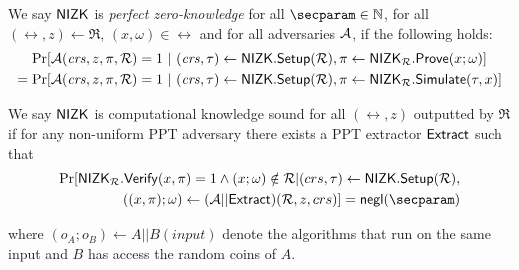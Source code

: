 \def\advV{\ensuremath{V^*}\xspace} %

\begin{definition}\label{def:nizk_zero_knowledge}
We say ${\mathsf{NIZK}}$ is {\em perfect zero-knowledge} for all $ \secparam \in \mathbb{N} $, for all $ (\rel,z) \leftarrow \mathfrak{R} $, $ (x,\omega) \in \rel $ and for all adversaries $ \mathcal{A} $, if the following holds:
\begin{align*}
	\Pr[& \mathcal{A}(\mathit{crs}, z, \pi,\mathcal{R}) = 1 \ | \ (\mathit{crs}, \tau) \leftarrow {\ensuremath{\mathsf{NIZK}}}.{\mathsf{Setup}} (\mathcal{R}),   \pi \leftarrow {\ensuremath{\mathsf{NIZK}}}_{\mathcal{R}}.{\mathsf{Prove}} (x;\omega)]\\
	=\Pr[& \mathcal{A}(\mathit{crs}, z, \pi,\mathcal{R}) = 1 \ | \ (\mathit{crs}, \tau) \leftarrow {\ensuremath{\mathsf{NIZK}}}.{\mathsf{Setup}} (\mathcal{R}),   \pi \leftarrow {\ensuremath{\mathsf{NIZK}}}_{\mathcal{R}}.{\mathsf{Simulate}} (\tau,x)]
\end{align*}

\end{definition}

\def\advP{\ensuremath{P^*}\xspace} %

\begin{definition}\label{def:nizk_knowledge_sound}
We say ${\mathsf{NIZK}}$ is {computational knowledge sound} for all $ (\rel,z)  $ outputted by $ \mathfrak{R} $ if
for any non-uniform PPT adversary \adv there exists a PPT extractor $ {\mathsf{Extract}} $
such that
\begin{align}
	\Pr[\NIZK_\rel.\Verify(x,\pi) = 1 \wedge  (x;\omega) \notin \rel | (crs,\tau) \leftarrow \NIZK.\Setup(\rel),\nonumber\\ ((x,\pi);\omega)\leftarrow (\adv||\Extract)(\rel,z,crs)] =  \negl(\secparam) \nonumber
\end{align}
	
where $ (o_A;o_B)\leftarrow A||B(input) $ denote the algorithms that run on the same input and $ B $ has access the random coins of $ A $.
\end{definition}


%

